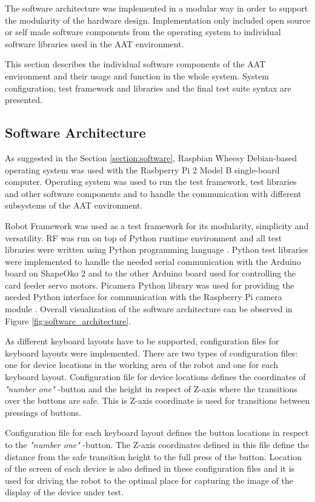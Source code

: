 The software architecture was implemented in a modular way in order to support the modularity of the hardware design. Implementation only included open source or self made software components from the operating system to individual software libraries used in the AAT environment.

This section describes the individual software components of the AAT environment and their usage and function in the whole system. System configuration, test framework and libraries and the final test suite syntax are presented.

\subsection{Software Architecture}
\label{subsection:Software architecture}

As suggested in the Section \ref{section:software}, Raspbian Wheesy Debian-based operating system was used with the Rasbperry Pi 2 Model B single-board computer. Operating system was used to run the test framework, test libraries and other software components and to handle the communication with different subsystems of the AAT environment.

Robot Framework was used as a test framework for its modularity, simplicity and versatility. RF was run on top of Python runtime environment and all test libraries were written using Python programming language \emph{\citep{python}}. Python test libraries were implemented to handle the needed serial communication with the Arduino board on ShapeOko 2 and to the other Arduino board used for controlling the card feeder servo motors. Picamera Python library was used for providing the needed Python interface for communication with the Raspberry Pi camera module \emph{\citep{picamera}}. Overall visualization of the software architecture can be observed in Figure \ref{fig:software_architecture}.

As different keyboard layouts have to be supported, configuration files for keyboard layouts were implemented. There are two types of configuration files: one for device locations in the working area of the robot and one for each keyboard layout. Configuration file for device locations defines the coordinates of \emph{"number one"} -button and the height in respect of Z-axis where the transitions over the buttons are safe. This is Z-axis coordinate is used for transitions between pressings of buttons. 

Configuration file for each keyboard layout defines the button locations in respect to the \emph{"number one"} -button. The Z-axis coordinates defined in this file define the distance from the safe transition height to the full press of the button. Location of the screen of each device is also defined in these configuration files and it is used for driving the robot to the optimal place for capturing the image of the display of the device under test. 

